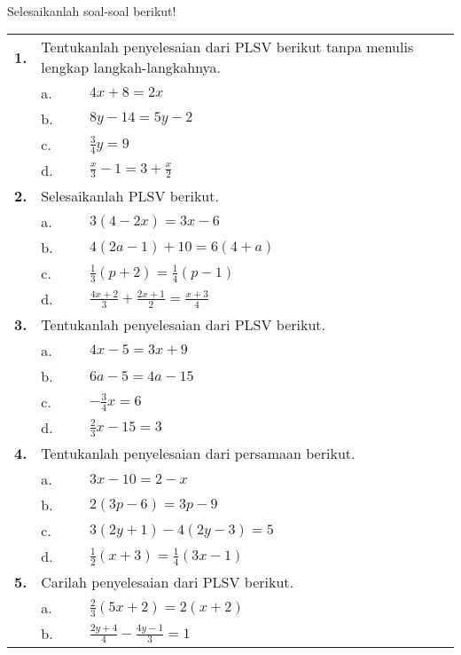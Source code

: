 \documentclass[11pt,a4paper]{article}
\begin{document}
\begin{flushleft}

\\
Selesaikanlah soal-soal berikut!\\[0.8em]
\begingroup
\renewcommand{\arraystretch}{1.6} %
\begin{tabular}{p{0.3cm}p{0.3cm}p{16cm}} 
   \bf{1.}&\multicolumn{2}{p{16cm}}{Tentukanlah penyelesaian dari PLSV berikut tanpa menulis lengkap langkah-langkahnya.}\\
    &a.&$4x+8=2x$\\
    &b.&$8y-14=5y-2$\\
    &c.&$\frac{3}{4}y=9$\\
    &d.&$\frac{x}{3}-1=3+\frac{x}{2}$\\
   \bf{2.}&\multicolumn{2}{p{16cm}}{Selesaikanlah PLSV berikut.}\\
    &a.&$3(4-2x)=3x-6$\\
    &b.&$4(2a-1)+10=6(4+a)$\\
    &c.&$\frac{1}{3}(p+2)=\frac{1}{4}(p-1)$\\
    &d.&$\frac{4x+2}{3}+\frac{2x+1}{2}=\frac{x+3}{4}$\\
   \bf{3.}&\multicolumn{2}{p{16cm}}{Tentukanlah penyelesaian dari PLSV berikut.}\\
    &a.&$4x-5=3x+9$\\
    &b.&$6a-5=4a-15$\\
    &c.&$-\frac{3}{4}x=6$\\
    &d.&$\frac{2}{3}x-15=3$\\
   \bf{4.}&\multicolumn{2}{p{16cm}}{Tentukanlah penyelesaian dari persamaan berikut.}\\
    &a.&$3x-10=2-x$\\
    &b.&$2(3p-6)=3p-9$\\
    &c.&$3(2y+1)-4(2y-3)=5$\\
    &d.&$\frac{1}{2}(x+3)=\frac{1}{4}(3x-1)$\\
   \bf{5.}&\multicolumn{2}{p{16cm}}{Carilah penyelesaian dari PLSV berikut.}\\
    &a.&$\frac{2}{3}(5x+2)=2(x+2)$\\
    &b.&$\frac{2y+4}{4}-\frac{4y-1}{3}=1$\\

\end{tabular}
\end{flushleft}
\end{document}
